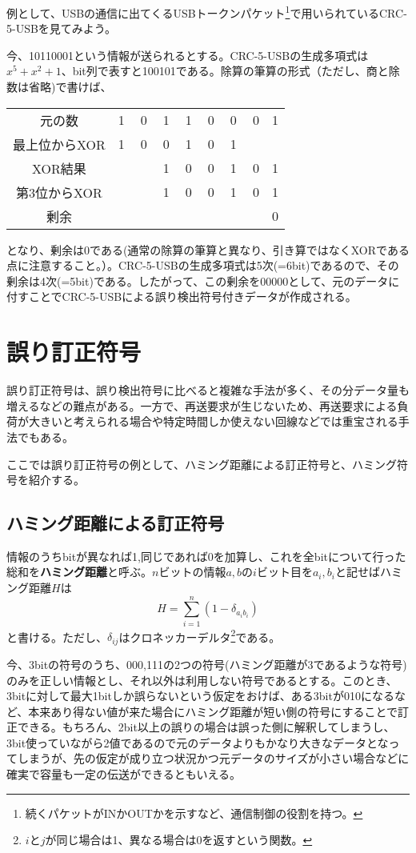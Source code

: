 例として、USBの通信に出てくるUSBトークンパケット\footnote{続くパケットがINかOUTかを示すなど、通信制御の役割を持つ。}で用いられているCRC-5-USBを見てみよう。

今、10110001という情報が送られるとする。CRC-5-USBの生成多項式は$x^5+x^2+1$、bit列で表すと100101である。除算の筆算の形式（ただし、商と除数は省略)で書けば、
\begin{center}
\begin{tabular}{c|cccccccc}
元の数&1&0&1&1&0&0&0&1\\
最上位からXOR&1&0&0&1&0&1& & \\ \hline
XOR結果& &　&1&0&0&1&0&1\\ 
第3位からXOR& &　&1&0&0&1&0&1\\ \hline
剰余& &　& &　& &　& &0\\ 
\end{tabular}
\end{center}
となり、剰余は0である(通常の除算の筆算と異なり、引き算ではなくXORである点に注意すること。）。CRC-5-USBの生成多項式は5次(=6bit)であるので、その剰余は4次(=5bit)である。したがって、この剰余を00000として、元のデータに付すことでCRC-5-USBによる誤り検出符号付きデータが作成される。

\section{誤り訂正符号}
誤り訂正符号は、誤り検出符号に比べると複雑な手法が多く、その分データ量も増えるなどの難点がある。一方で、再送要求が生じないため、再送要求による負荷が大きいと考えられる場合や特定時間しか使えない回線などでは重宝される手法でもある。

ここでは誤り訂正符号の例として、ハミング距離による訂正符号と、ハミング符号を紹介する。

\subsection{ハミング距離による訂正符号}
情報のうちbitが異なれば1,同じであれば0を加算し、これを全bitについて行った総和を\textbf{ハミング距離}と呼ぶ。$n$ビットの情報$a,b$の$i$ビット目を$a_i,b_i$と記せばハミング距離$H$は
\begin{equation}
H=\sum^{n}_{i=1} \left(1-\delta_{a_ib_i}\right)
\end{equation}
と書ける。ただし、$\delta_{ij}$はクロネッカーデルタ\footnote{$i$と$j$が同じ場合は1、異なる場合は0を返すという関数。}である。

今、3bitの符号のうち、000,111の2つの符号(ハミング距離が3であるような符号)のみを正しい情報とし、それ以外は利用しない符号であるとする。このとき、3bitに対して最大1bitしか誤らないという仮定をおけば、ある3bitが010になるなど、本来あり得ない値が来た場合にハミング距離が短い側の符号にすることで訂正できる。もちろん、2bit以上の誤りの場合は誤った側に解釈してしまうし、3bit使っていながら2値であるので元のデータよりもかなり大きなデータとなってしまうが、先の仮定が成り立つ状況かつ元データのサイズが小さい場合などに確実で容量も一定の伝送ができるともいえる。

